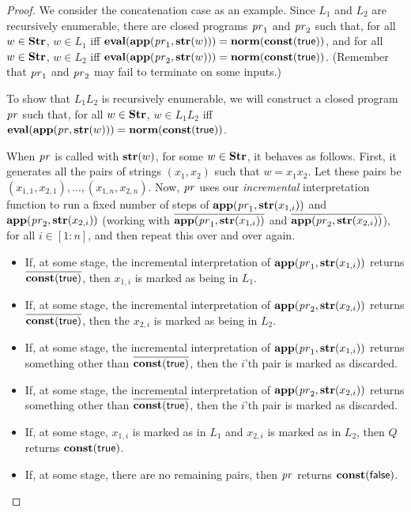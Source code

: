 \begin{proof}
We consider the concatenation case as an example.  Since $L_1$ and
$L_2$ are recursively enumerable, there are closed programs $\mathit{pr}_1$ and
$\mathit{pr}_2$ such that, for all $w\in\mathbf{Str}$, $w\in L_1$ iff
$\mathbf{eval}(\mathbf{app}(\mathit{pr}_1,\mathbf{str}(w)))=\mathbf{norm}(\mathbf{const}(\mathsf{true}))$, and
for all $w\in\mathbf{Str}$, $w\in L_2$ iff
$\mathbf{eval}(\mathbf{app}(\mathit{pr}_2,\mathbf{str}(w)))=\mathbf{norm}(\mathbf{const}(\mathsf{true}))$.
(Remember that $\mathit{pr}_1$ and $\mathit{pr}_2$ may fail to terminate on some
inputs.)

To show that $L_1L_2$ is recursively enumerable, we will construct a
closed program $\mathit{pr}$ such that, for all $w\in\mathbf{Str}$, $w\in L_1L_2$ iff
$\mathbf{eval}(\mathbf{app}(\mathit{pr},\mathbf{str}(w)))=\mathbf{norm}(\mathbf{const}(\mathsf{true}))$.

When $\mathit{pr}$ is called with $\mathbf{str}(w)$, for some $w\in\mathbf{Str}$, it
behaves as follows.  First, it generates all the pairs of strings
$(x_1,x_2)$ such that $w=x_1x_2$.  Let these pairs be
$(x_{1,1},x_{2,1}),\ldots,(x_{1,n},x_{2,n})$.  Now, $\mathit{pr}$ uses our
\emph{incremental} interpretation function to run a fixed number of
steps of $\mathbf{app}(\mathit{pr}_1,\mathbf{str}(x_{1,i}))$ and
$\mathbf{app}(\mathit{pr}_2,\mathbf{str}(x_{2,i}))$ (working with
$\overline{\mathbf{app}(\mathit{pr}_1,\mathbf{str}(x_{1,i}))}$ and
$\overline{\mathbf{app}(\mathit{pr}_2,\mathbf{str}(x_{2,i}))}$), for all $i\in[1:n]$,
and then repeat this over and over again.

\begin{itemize}
\item If, at some stage, the incremental interpretation of
  $\mathbf{app}(\mathit{pr}_1,\mathbf{str}(x_{1,i}))$ returns
  $\overline{\mathbf{const}(\mathsf{true})}$, then $x_{1,i}$ is marked as being in
  $L_1$.

\item If, at some stage, the incremental interpretation of
  $\mathbf{app}(\mathit{pr}_2,\mathbf{str}(x_{2,i}))$ returns
  $\overline{\mathbf{const}(\mathsf{true})}$, then the $x_{2,i}$ is marked as
  being in $L_2$.

\item If, at some stage, the incremental interpretation of
  $\mathbf{app}(\mathit{pr}_1,\mathbf{str}(x_{1,i}))$ returns something other than
  $\overline{\mathbf{const}(\mathsf{true})}$, then the $i$'th pair is marked as
  discarded.

\item If, at some stage, the incremental interpretation of
  $\mathbf{app}(\mathit{pr}_2,\mathbf{str}(x_{2,i}))$ returns something other than
  $\overline{\mathbf{const}(\mathsf{true})}$, then the $i$'th pair is marked as
  discarded.

\item If, at some stage, $x_{1,i}$ is marked as in $L_1$ and $x_{2,i}$
  is marked as in $L_2$, then $Q$ returns $\mathbf{const}(\mathsf{true})$.

\item If, at some stage, there are no remaining pairs, then $\mathit{pr}$
  returns $\mathbf{const}(\mathsf{false})$.
\end{itemize}
\end{proof}

